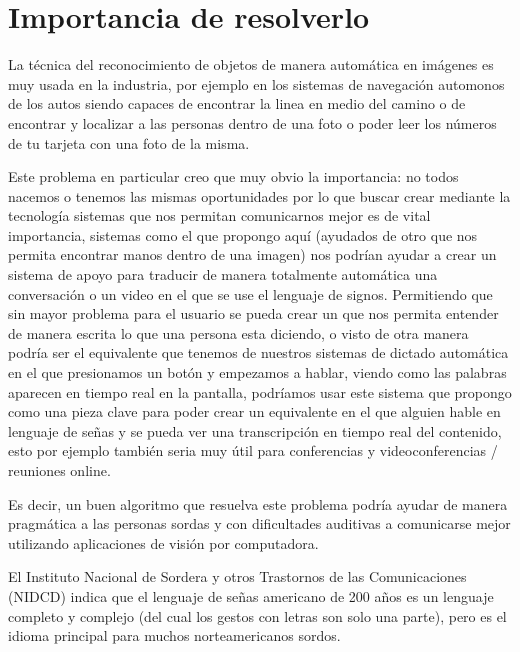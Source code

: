 \documentclass[12pt, fleqn]{report}                             %
\newcommand \Quote              {\qq}                           %
\theoremstyle{break}                                            %
\begin{document}
        \section{Importancia de resolverlo}

        La técnica del reconocimiento de objetos de manera automática en imágenes es muy usada en la industria,
        por ejemplo en los sistemas de navegación automonos de los autos siendo capaces de encontrar la linea en medio del
        camino o de encontrar y localizar a las personas dentro de una foto o poder leer los números de tu tarjeta con una foto de
        la misma.

        Este problema en particular creo que muy obvio la importancia: no todos nacemos o tenemos las mismas oportunidades
        por lo que buscar crear mediante la tecnología sistemas que nos permitan comunicarnos mejor es de vital importancia,
        sistemas como el que propongo aquí (ayudados de otro que nos permita encontrar manos dentro de una imagen) nos podrían
        ayudar a crear un sistema de apoyo para traducir de manera totalmente automática una conversación o un video en el
        que se use el lenguaje de signos.
        Permitiendo que sin mayor problema para el usuario se pueda crear un \Quote{transcript} que nos permita entender de manera
        escrita lo que una persona esta diciendo, o visto de otra manera podría ser el equivalente que tenemos de nuestros
        sistemas de dictado automática en el que presionamos un botón y empezamos a hablar, viendo como las palabras aparecen
        en tiempo real en la pantalla, podríamos usar este sistema que propongo como una pieza clave para poder crear un
        equivalente en el que alguien hable en lenguaje de señas y se pueda ver una transcripción en tiempo real del contenido,
        esto por ejemplo también seria muy útil para conferencias y videoconferencias / reuniones online.

        Es decir, un buen algoritmo que resuelva este problema podría ayudar de manera pragmática a las personas
        sordas y con dificultades auditivas a comunicarse mejor utilizando aplicaciones de visión por computadora.

        El Instituto Nacional de Sordera y otros Trastornos de las Comunicaciones (NIDCD)
        indica que el lenguaje de señas americano de 200 años es un lenguaje completo y complejo
        (del cual los gestos con letras son solo una parte), pero es el idioma principal para
        muchos norteamericanos sordos.
\end{document}
